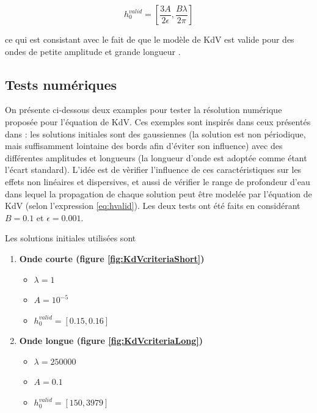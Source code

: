 \begin{equation} 
\label{eq:hvalid}
h_0^{valid} = \left[ \frac{3A}{2\epsilon}, \frac{B\lambda}{2\pi}\right]
\end{equation}

\noindent ce qui est consistant avec le fait de que le modèle de KdV est valide pour des ondes de petite amplitude et grande longueur \cite{BBM1971}.

\subsection{Tests numériques}

\indent On présente ci-dessous deux examples pour tester la résolution numérique proposée pour l'équation de KdV. Ces exemples sont inspirés dans ceux présentés dans \cite{conservationLaws2002}: les solutions initiales sont des gaussiennes (la solution est non périodique, mais suffisamment lointaine des bords afin d'éviter son influence) avec des différentes amplitudes et longueurs (la longueur d'onde est adoptée comme étant l'écart standard). L'idée est de vèrifier l'influence de ces caractéristiques sur les effets non linéaires et dispersives, et aussi de vérifier le range de profondeur d'eau dans lequel la propagation de chaque solution peut être modelée par l'équation de KdV (selon l'expression \ref{eq:hvalid}). Les deux tests ont été faits en considérant $B = 0.1$ et $\epsilon = 0.001$.

\indent Les solutions initiales utilisées sont

\begin{enumerate}
	\item \textbf{Onde courte (figure \ref{fig:KdVcriteriaShort})} %
		\begin{itemize}
			\item $\lambda = 1$
			\item $ A = 10^{-5}$
			\item $ h_0^{valid} = [0.15, 0.16] $
		\end{itemize}
	\item \textbf{Onde longue (figure \ref{fig:KdVcriteriaLong})} %
		\begin{itemize}
			\item $\lambda = 250000$
			\item $ A = 0.1$
			\item $ h_0^{valid} = [150, 3979] $
		\end{itemize}
\end{enumerate}


